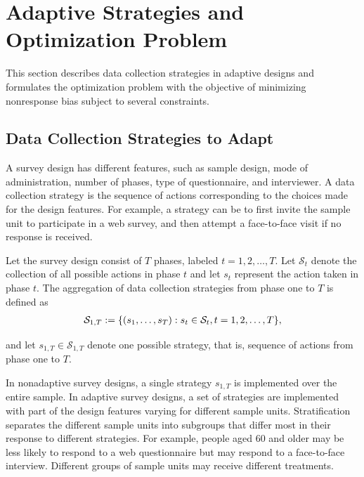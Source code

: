\documentclass[12pt]{article}
\begin{document}
\section{Adaptive Strategies and Optimization Problem}
\label{sec:adaptive-strategies-optimization-problem}

This section describes data collection strategies in adaptive designs and formulates the optimization problem with the objective of minimizing nonresponse bias subject to several constraints.

\subsection{Data Collection Strategies to Adapt}
\label{subsec:data-collection-strategies-adapt}

A survey design has different features, such as sample design, mode of administration, number of phases, type of questionnaire, and interviewer.
A data collection strategy is the sequence of actions corresponding to the choices made for the design features.
For example, a strategy can be to first invite the sample unit to participate in a web survey, and then attempt a face-to-face visit if no response is received.


Let the survey design consist of $T$ phases, labeled $t=1,2,\dots,T$.
Let $\mathcal{S}_t$ denote the collection of all possible actions in phase $t$ and let $s_t$ represent the action taken in phase $t$.
The aggregation of data collection strategies from phase one to $T$ is defined as
\let\saveeqnno\theequation
\let\savefrac\frac
\def\dispfrac{\displaystyle\savefrac}
\begin{eqnarray*}
\let\frac\dispfrac
\let\theHequation\theequation
	\mathcal{S}_{1,T}:=\{(s_1,\dots,s_T):s_t \in \mathcal{S}_t, t=1,2,\dots,T\},
\end{eqnarray*}
\global\let\theequation\saveeqnno
\addtocounter{equation}{-1}\ignorespaces 

and let $s_{1,T} \in \mathcal{S}_{1,T}$ denote one possible strategy, that is, sequence of actions from phase one to $T$.

In nonadaptive survey designs, a single strategy $s_{1,T}$ is implemented over the entire sample.
In adaptive survey designs, a set of strategies are implemented with part of the design features varying for different sample units.
Stratification separates the different sample units into subgroups that differ most in their response to different strategies.
For example, people aged 60 and older may be less likely to respond to a web questionnaire but may respond to a face-to-face interview.
Different groups of sample units may receive different treatments.
\end{document}
